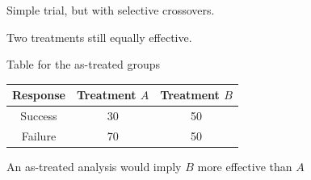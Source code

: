 \documentclass[ignorenonframetext,]{beamer}
\begin{document}
\begin{frame}{Simple trial, but with selective crossovers.}

Two treatments still equally effective.

Table for the as-treated groups

\begin{longtable}[]{@{}ccc@{}}
\toprule
\begin{minipage}[b]{0.15\columnwidth}\centering\strut
Response\strut
\end{minipage} & \begin{minipage}[b]{0.22\columnwidth}\centering\strut
Treatment \(A\)\strut
\end{minipage} & \begin{minipage}[b]{0.25\columnwidth}\centering\strut
Treatment \(B\)\strut
\end{minipage}\tabularnewline
\midrule
\endhead
\begin{minipage}[t]{0.15\columnwidth}\centering\strut
Success\strut
\end{minipage} & \begin{minipage}[t]{0.22\columnwidth}\centering\strut
30\strut
\end{minipage} & \begin{minipage}[t]{0.25\columnwidth}\centering\strut
50\strut
\end{minipage}\tabularnewline
\begin{minipage}[t]{0.15\columnwidth}\centering\strut
Failure\strut
\end{minipage} & \begin{minipage}[t]{0.22\columnwidth}\centering\strut
70\strut
\end{minipage} & \begin{minipage}[t]{0.25\columnwidth}\centering\strut
50\strut
\end{minipage}\tabularnewline
\bottomrule
\end{longtable}

An as-treated analysis would imply \(B\) more effective than \(A\)

\end{frame}
\end{document}
